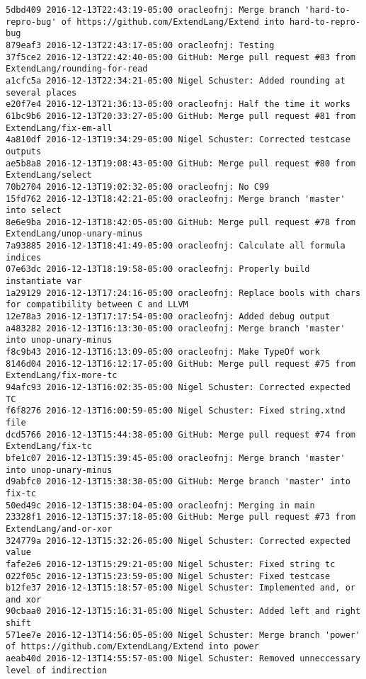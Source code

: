 \begin{lstlisting}
5dbd409 2016-12-13T22:43:19-05:00 oracleofnj: Merge branch 'hard-to-repro-bug' of https://github.com/ExtendLang/Extend into hard-to-repro-bug
879eaf3 2016-12-13T22:43:17-05:00 oracleofnj: Testing
37f5ce2 2016-12-13T22:42:40-05:00 GitHub: Merge pull request #83 from ExtendLang/rounding-for-read
a1cfc5a 2016-12-13T22:34:21-05:00 Nigel Schuster: Added rounding at several places
e20f7e4 2016-12-13T21:36:13-05:00 oracleofnj: Half the time it works
61bc9b6 2016-12-13T20:33:27-05:00 GitHub: Merge pull request #81 from ExtendLang/fix-em-all
4a810df 2016-12-13T19:34:29-05:00 Nigel Schuster: Corrected testcase outputs
ae5b8a8 2016-12-13T19:08:43-05:00 GitHub: Merge pull request #80 from ExtendLang/select
70b2704 2016-12-13T19:02:32-05:00 oracleofnj: No C99
15fd762 2016-12-13T18:42:21-05:00 oracleofnj: Merge branch 'master' into select
8e6e9ba 2016-12-13T18:42:05-05:00 GitHub: Merge pull request #78 from ExtendLang/unop-unary-minus
7a93885 2016-12-13T18:41:49-05:00 oracleofnj: Calculate all formula indices
07e63dc 2016-12-13T18:19:58-05:00 oracleofnj: Properly build instantiate var
1a29129 2016-12-13T17:24:16-05:00 oracleofnj: Replace bools with chars for compatibility between C and LLVM
12e78a3 2016-12-13T17:17:54-05:00 oracleofnj: Added debug output
a483282 2016-12-13T16:13:30-05:00 oracleofnj: Merge branch 'master' into unop-unary-minus
f8c9b43 2016-12-13T16:13:09-05:00 oracleofnj: Make TypeOf work
8146d04 2016-12-13T16:12:17-05:00 GitHub: Merge pull request #75 from ExtendLang/fix-more-tc
94afc93 2016-12-13T16:02:35-05:00 Nigel Schuster: Corrected expected TC
f6f8276 2016-12-13T16:00:59-05:00 Nigel Schuster: Fixed string.xtnd file
dcd5766 2016-12-13T15:44:38-05:00 GitHub: Merge pull request #74 from ExtendLang/fix-tc
bfe1c07 2016-12-13T15:39:45-05:00 oracleofnj: Merge branch 'master' into unop-unary-minus
d9abfc0 2016-12-13T15:38:38-05:00 GitHub: Merge branch 'master' into fix-tc
50ed49c 2016-12-13T15:38:04-05:00 oracleofnj: Merging in main
23328f1 2016-12-13T15:37:18-05:00 GitHub: Merge pull request #73 from ExtendLang/and-or-xor
324779a 2016-12-13T15:32:26-05:00 Nigel Schuster: Corrected expected value
fafe2e6 2016-12-13T15:29:21-05:00 Nigel Schuster: Fixed string tc
022f05c 2016-12-13T15:23:59-05:00 Nigel Schuster: Fixed testcase
b12fe37 2016-12-13T15:18:57-05:00 Nigel Schuster: Implemented and, or and xor
90cbaa0 2016-12-13T15:16:31-05:00 Nigel Schuster: Added left and right shift
571ee7e 2016-12-13T14:56:05-05:00 Nigel Schuster: Merge branch 'power' of https://github.com/ExtendLang/Extend into power
aeab40d 2016-12-13T14:55:57-05:00 Nigel Schuster: Removed unneccessary level of indirection

\end{lstlisting}
